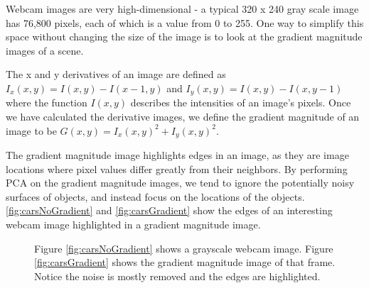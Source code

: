 Webcam images are very high-dimensional - a typical 320 x 240 gray scale image has 76,800 pixels, each of
which is a value from 0 to 255.  One way to simplify this space without changing the size of the image is to look at the gradient magnitude images of a scene.  

The x and y derivatives of an image are defined as $I_x(x,y) = I(x,y)-I(x-1,y)$ and $I_y(x,y) = I(x,y)-I(x,y-1)$ where the function $I(x,y)$ describes the intensities of an image's pixels.  Once we have calculated the derivative images, we define the gradient magnitude of an image to be $G(x,y) = I_x(x,y)^2 + I_y(x,y)^2$.

The gradient magnitude image highlights edges in an image, as they are image locations where pixel values differ greatly from their neighbors.  By performing PCA on the gradient magnitude images, we tend to ignore the potentially noisy surfaces of objects, and instead focus on the locations of the objects.  \ref{fig:carsNoGradient} and \ref{fig:carsGradient} show the edges of an interesting webcam image highlighted in a gradient magnitude image.


\begin{figure}
	\centering
		\caption[Focusing on object edges with gradient magnitude images.]{Figure \ref{fig:carsNoGradient} shows a grayscale webcam image. Figure \ref{fig:carsGradient} shows the gradient magnitude image of that frame.  Notice the noise is mostly removed and the edges are highlighted.}
\end{figure}

